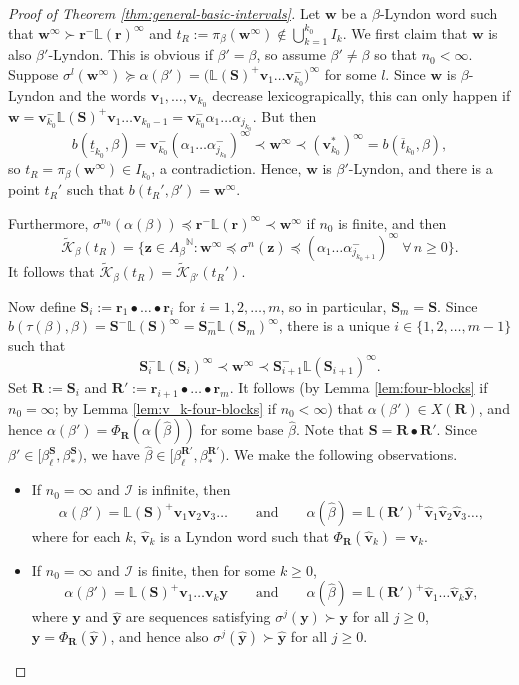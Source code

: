 \documentclass[11pt]{amsart}
\theoremstyle{definition}
\theoremstyle{remark}
\numberwithin{equation}{section}
\newcommand{\N}{\ensuremath{\mathbb{N}}}
\renewcommand{\L}{\ensuremath{\mathbb{L}}}
\newcommand{\II}{\mathcal{I}}
\newcommand{\Kt}{\widetilde{\mathcal{K}}}
\newcommand{\bR}{\mathbf{R}}
\newcommand{\cs}{ {\mathbf{S}}}
\renewcommand{\r}{ {\mathbf{r}}}
\renewcommand{\v}{\mathbf{v}}
\newcommand{\w}{\mathbf{w}}
\newcommand{\y}{\mathbf{y}}
\newcommand{\z}{\mathbf{z}}
\newcommand{\f}{\infty}
\newcommand{\al}{\alpha}
\newcommand{\lle}{\preccurlyeq}
\newcommand{\lge}{\succcurlyeq}
\newcommand{\si}{\sigma}
\begin{document}
\begin{proof}[Proof of Theorem \ref{thm:general-basic-intervals}]
Let $\w$ be a $\beta$-Lyndon word such that $\w^\f\succ \r^-\L(\r)^\f$ and $t_R:=\pi_\beta(\w^\f)\not\in\bigcup_{k=1}^{k_0}I_k$. %
We first claim that $\w$ is also $\beta'$-Lyndon. This is obvious if $\beta'=\beta$, so assume $\beta'\neq\beta$ so that $n_0<\f$. Suppose $\si^l(\w^\f)\lge \al(\beta')=\big(\L(\cs)^+\v_1\dots\v_{k_0}^-\big)^\f$ for some $l$. Since $\w$ is $\beta$-Lyndon and the words $\v_1,\dots,\v_{k_0}$ decrease lexicograpically, this can only happen if $\w=\v_{k_0}^-\L(\cs)^+\v_1\dots\v_{k_0-1}=\v_{k_0}^-\al_1\dots\al_{j_{k_0}}$. But then
\[
b(\underline{t}_{k_0},\beta)=\v_{k_0}^-(\al_1\dots\al_{j_{k_0}}^-)^\f\prec \w^\f \prec (\v_{k_0}^*)^\f=b(\overline{t}_{k_0},\beta),
\]
so $t_R=\pi_\beta(\w^\f)\in I_{k_0}$, a contradiction. Hence, $\w$ is $\beta'$-Lyndon, and there is a point $t_R'$ such that $b(t_R',\beta')=\w^\f$.

Furthermore, $\si^{n_0}(\al(\beta)){\lle\r^-\L(\r)^\f}\prec\w^\f$ if $n_0$ is finite, and then
\[
\Kt_\beta(t_R)=\{\z\in{A_\beta}^\N: \w^\f\lle \si^n(\z)\lle (\al_1\dots\al_{j_{{k_0+1}}}^-)^\f\ \forall\,n\geq 0\}.
\]
It follows that $\Kt_\beta(t_R)=\Kt_{\beta'}(t_R')$.

Now define $\cs_i:=\r_1\bullet\dots\bullet\r_i$ for $i=1,2,\dots,m$, so in particular, $\cs_m=\cs$. Since ${b(\tau(\beta),\beta)}=\cs^-\L(\cs)^\f=\cs_m^-\L(\cs_m)^\f$, there is a unique $i\in\{1,2,\dots,m-1\}$ such that
\[
\cs_i^-\L(\cs_i)^\f\prec \w^\f \prec \cs_{i+1}^-\L(\cs_{i+1})^\f.
\]
Set $\bR:=\cs_i$ and $\bR':=\r_{i+1}\bullet\dots\bullet\r_m$. It follows (by Lemma \ref{lem:four-blocks} if $n_0=\f$; by Lemma \ref{lem:v_k-four-blocks} if $n_0<\f$) that $\al(\beta')\in X(\bR)$, and hence $\al(\beta')=\Phi_\bR(\al(\hat{\beta}))$ for some base $\hat{\beta}$. Note that $\cs=\bR\bullet\bR'$. Since $\beta'\in [\beta_\ell^{\cs},\beta_*^{\cs})$, we have $\hat{\beta}\in [\beta_\ell^{\bR'},\beta_*^{\bR'})$. We make the following observations.
\begin{itemize}
\item If $n_0=\f$ and $\II$ is infinite, then 
\[
\al(\beta')=\L(\cs)^+\v_1\v_2\v_3\dots \qquad\mbox{and} \qquad \al(\hat{\beta})=\L(\bR')^+\hat{\v}_1\hat{\v}_2\hat{\v}_3\dots,
\] 
where for each $k$, $\hat{\v}_k$ is a Lyndon word such that $\Phi_\bR(\hat{\v}_k)=\v_k$.

\item If $n_0=\f$ and $\II$ is finite, then for some $k\geq 0$, 
\[
\al(\beta')=\L(\cs)^+\v_1\dots\v_k \y \qquad\mbox{and} \qquad \al(\hat{\beta})=\L(\bR')^+\hat{\v}_1\dots\hat{\v}_k \hat{\y},
\] 
where $\y$ and $\hat{\y}$ are sequences satisfying $\si^j(\y)\succ\y$ for all $j\geq 0$, $\y=\Phi_\bR(\hat{\y})$, and hence also $\si^j(\hat{\y})\succ\hat{\y}$ for all $j\geq 0$.


\end{itemize}
\end{proof}
\end{document}
